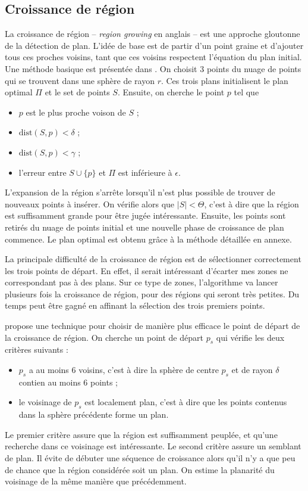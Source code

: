 \documentclass[12pt, twoside]{article}
\begin{document}
\subsection{Croissance de région}
La croissance de région -- \textit{region growing} en anglais – est une approche gloutonne de la détection de plan. L’idée de base est de partir d’un point graine et d’ajouter tous ces proches voisins, tant que ces voisins respectent l’équation du plan initial. Une méthode basique est présentée dans \cite{reggrow1}. On choisit 3 points du nuage de points qui se trouvent dans une sphère de rayon $r$. Ces trois plans initialisent le plan optimal $\Pi$ et le set de points $S$. Ensuite, on cherche le point $p$ tel que
\begin{itemize}
  \item $p$ est le plus proche voison de $S$ ;
  \item $\text{dist}(S,p) < \delta$ ;
  \item $\text{dist}(S,p) < \gamma$ ;
  \item l'erreur entre $S\cup\{p\}$ et $\Pi$ est inférieure à $\epsilon$.
\end{itemize}

L'expansion de la région s'arrête lorsqu'il n'est plus possible de trouver de nouveaux points à insérer. On vérifie alors que $\vert S\vert < \Theta$, c'est à dire que la région est suffisamment grande pour être jugée intéressante. Ensuite, les points sont retirés du nuage de points initial et une nouvelle phase de croissance de plan commence. Le plan optimal est obtenu grâce à la méthode détaillée en annexe.

La principale difficulté de la croissance de région est de sélectionner correctement les trois points de départ. En effet, il serait intéressant d'écarter mes zones ne correspondant pas à des plans. Sur ce type de zones, l'algorithme va lancer plusieurs fois la croissance de région, pour des régions qui seront très petites. Du temps peut être gagné en affinant la sélection des trois premiers points.

\cite{reggrow2} propose une technique pour choisir de manière plus efficace le point de départ de la croissance de région. On cherche un point de départ $p_s$ qui vérifie les deux critères suivants :
\begin{itemize}
  \item $p_s$ a au moins 6 voisins, c'est à dire la sphère de centre $p_s$ et de rayon $\delta$ contien au moins 6 points ;
  \item le voisinage de $p_s$ est localement plan, c'est à dire que les points contenus dans la sphère précédente forme un plan.
\end{itemize}
Le premier critère assure que la région est suffisamment peuplée, et qu’une recherche dans ce voisinage est intéressante. Le second critère assure un semblant de plan. Il évite de débuter une séquence de croissance alors qu’il n’y a que peu de chance que la région considérée soit un plan. On estime la planarité du voisinage de la même manière que précédemment.
\end{document}
